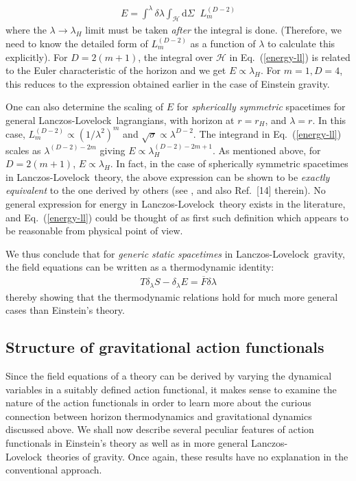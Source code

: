 \documentclass[12pt]{iopart}
\def\DM{\mathrm{d}}
\def\eq#1{{Eq.~(\ref{#1})}}
\newcommand{\LL}{Lanczos-Lovelock}
\begin{document}
\begin{eqnarray}
E = \int^{\lambda} \delta \lambda \int_\mathcal{H} \DM \Sigma \;\; L^{(D-2)}_{m}
\label{energy-ll}
\end{eqnarray}
where the $\lambda \rightarrow \lambda_H$ limit must be taken \textit{after} the integral is done. (Therefore, we need to know the detailed form of $L^{(D-2)}_{m}$ as a function of $\lambda$ to calculate this explicitly). For $D = 2 (m+1)$, the integral over $\mathcal{H}$  in \eq{energy-ll} is related to the Euler characteristic of the horizon and we get $E \propto \lambda_H$.  For $m=1, D=4$, this reduces to the expression obtained earlier in the case of Einstein gravity. 

One can also determine the scaling of $E$ for \textit{spherically symmetric} spacetimes for general \LL\ lagrangians, with horizon at $r=r_H$, and $\lambda=r$. In this case, $L^{(D-2)}_{m} \propto (1/{\lambda}^2)^{m}$ and $\sqrt{\sigma} \propto {\lambda}^{D-2}$. The integrand in \eq{energy-ll}  scales as ${\lambda}^{(D-2) - 2 m}$ giving $E \propto \lambda_H^{(D-2) - 2 m + 1}$. As mentioned above, for $D = 2 (m+1)$, $E \propto \lambda_H$. In fact, in the case of spherically symmetric spacetimes in \LL\ theory, the above expression can be  shown to be \textit{exactly equivalent} to the one derived by others (see \cite{KP}, and also Ref.~[14] therein). 
No general expression for energy in \LL\ theory exists in the literature, and \eq{energy-ll} could be thought of as first such definition which appears to be reasonable from physical point of view.

We thus conclude that for \textit{generic static spacetimes} in \LL\ gravity, the field equations can be written as a thermodynamic identity:
\begin{eqnarray}
T \delta_{\lambda} S - \delta_{\lambda} E = \overline{F} \delta \lambda  
\end{eqnarray} 
thereby showing that the thermodynamic relations hold for much more   general cases than Einstein's  theory.




\subsection{Structure of gravitational action functionals}

 Since the field equations of  a theory can be derived by varying the dynamical variables in a suitably defined action functional, it makes sense to examine the nature of the action functionals in order to learn more about the curious connection between horizon thermodynamics and gravitational dynamics discussed above.  
  We shall now  describe several peculiar features of action functionals in  Einstein's theory 
  as well as in more general
   \LL\ theories of gravity. Once again, these results have no explanation in 
  the conventional approach.
 
\end{document}
